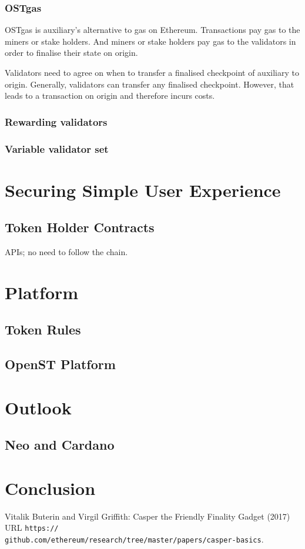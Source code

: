 \documentclass[12pt,a4paper,draft]{article}
\begin{document}
\subsubsection{OSTgas}

OSTgas is auxiliary's alternative to gas on Ethereum.
Transactions pay gas to the miners or stake holders.
And miners or stake holders pay gas to the validators in order to finalise their state on origin.

Validators need to agree on when to transfer a finalised checkpoint of auxiliary to origin.
Generally, validators can transfer any finalised checkpoint.
However, that leads to a transaction on origin and therefore incurs costs.

\subsubsection{Rewarding validators}

\subsubsection{Variable validator set}

\section{Securing Simple User Experience}

\subsection{Token Holder Contracts}

APIs; no need to follow the chain.

\section{Platform}

\subsection{Token Rules}

\subsection{OpenST Platform}

\section{Outlook}

\subsection{Neo and Cardano}

\section{Conclusion}

\begin{thebibliography}{9}

  Vitalik Buterin and Virgil Griffith:
  Casper the Friendly Finality Gadget (2017) URL \texttt{https://\\github.com/ethereum/research/tree/master/papers/casper-basics}.

\end{thebibliography}
\end{document}
